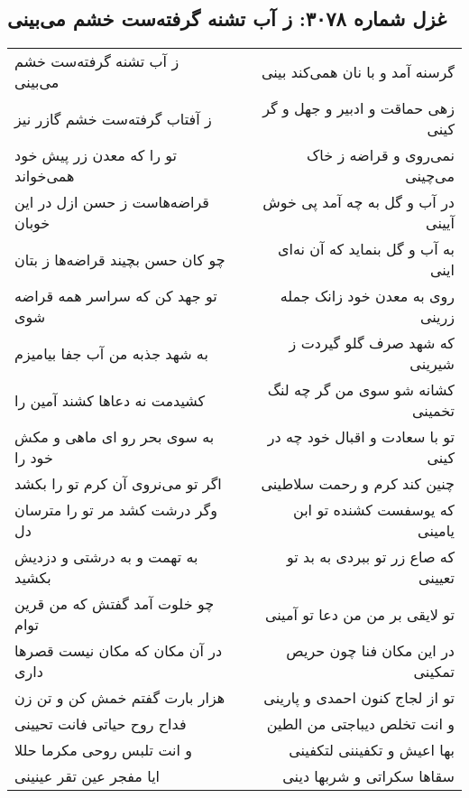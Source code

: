 \begin{center}
\section*{غزل شماره ۳۰۷۸: ز آب تشنه گرفته‌ست خشم می‌بینی}
\label{sec:3078}
\begin{longtable}{l p{0.5cm} r}
ز آب تشنه گرفته‌ست خشم می‌بینی
&&
گرسنه آمد و با نان همی‌کند بینی
\\
ز آفتاب گرفته‌ست خشم گازر نیز
&&
زهی حماقت و ادبیر و جهل و گر کینی
\\
تو را که معدن زر پیش خود همی‌خواند
&&
نمی‌روی و قراضه ز خاک می‌چینی
\\
قراضه‌هاست ز حسن ازل در این خوبان
&&
در آب و گل به چه آمد پی خوش آیینی
\\
چو کان حسن بچیند قراضه‌ها ز بتان
&&
به آب و گل بنماید که آن نه‌ای اینی
\\
تو جهد کن که سراسر همه قراضه شوی
&&
روی به معدن خود زانک جمله زرینی
\\
به شهد جذبه من آب جفا بیامیزم
&&
که شهد صرف گلو گیردت ز شیرینی
\\
کشیدمت نه دعاها کشند آمین را
&&
کشانه شو سوی من گر چه لنگ تخمینی
\\
به سوی بحر رو ای ماهی و مکش خود را
&&
تو با سعادت و اقبال خود چه در کینی
\\
اگر تو می‌نروی آن کرم تو را بکشد
&&
چنین کند کرم و رحمت سلاطینی
\\
وگر درشت کشد مر تو را مترسان دل
&&
که یوسفست کشنده تو ابن یامینی
\\
به تهمت و به درشتی و دزدیش بکشید
&&
که صاع زر تو ببردی به بد تو تعیینی
\\
چو خلوت آمد گفتش که من قرین توام
&&
تو لایقی بر من من دعا تو آمینی
\\
در آن مکان که مکان نیست قصرها داری
&&
در این مکان فنا چون حریص تمکینی
\\
هزار بارت گفتم خمش کن و تن زن
&&
تو از لجاج کنون احمدی و پارینی
\\
فداح روح حیاتی فانت تحیینی
&&
و انت تخلص دیباجتی من الطین
\\
و انت تلبس روحی مکرما حللا
&&
بها اعیش و تکفیننی لتکفینی
\\
ایا مفجر عین تقر عینینی
&&
سقاها سکراتی و شربها دینی
\\
\end{longtable}
\end{center}
